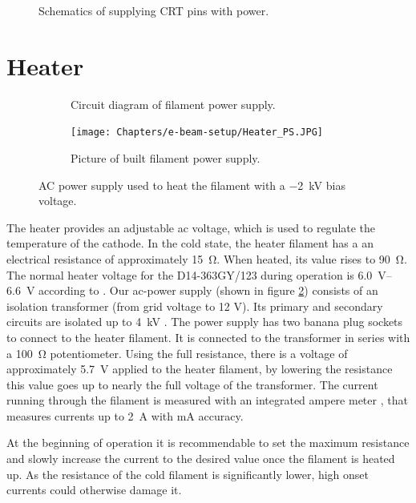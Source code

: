 \begin{figure}[H]
	\centering
	
	\begin{circuitikz}[european]
		
	\end{circuitikz}

	\caption{Schematics of supplying CRT pins with power.}
	\label{fig:schematics of wiring}
\end{figure}


\section{Heater}
\label{sec:Heater}

\begin{figure}[ht]
	\centering
	
	\begin{subfigure}[b]{0.9\textwidth}
		\begin{circuitikz}%
			
		\end{circuitikz}
		\caption{Circuit diagram of filament power supply.}
	\end{subfigure}
	
	\vspace{1cm}

	\begin{subfigure}[b]{0.9\textwidth}
		\texttt{[image: Chapters/e-beam-setup/Heater\_PS.JPG]}
		\caption{Picture of built filament power supply.}
	\end{subfigure}
	
	\caption{AC power supply used to heat the filament with a \SI{-2}{\kilo\volt} bias voltage.}
	\label{fig:heater_circuit}
\end{figure}

The heater provides an adjustable ac voltage, which is used to regulate the temperature of the cathode. In the cold state, the heater filament has a an electrical resistance of approximately \SI{15}{\ohm}. When heated, its value rises to \SI{90}{\ohm}. The normal heater voltage for the D14-363GY/123 during  operation is \SIrange{6.0}{6.6}{\volt} according to \cite{D14363GY123-manual}. 
Our ac-power supply (shown in figure \ref{fig:heater_circuit}) consists of an isolation transformer (from grid voltage to 12 V). Its primary  and secondary circuits are isolated up to \SI{4}{\kilo\volt} \cite{DS44231-DataSheet}. The power supply has two  banana plug sockets to connect to the heater filament. 
It is connected to the transformer in series with a \SI{100}{\ohm} potentiometer. Using the full resistance, there is a voltage of approximately \SI{5.7}{\volt} applied to the heater filament, by lowering the resistance this value goes up to nearly the full voltage of the transformer. 
The current running through the filament is measured with an integrated ampere meter \cite{ACA-20PC-manual}, that measures currents up to  \SI{2}{\ampere} with \si{\milli\ampere} accuracy.

At the beginning of operation it is recommendable to set the maximum resistance and slowly increase the current to the desired value once the filament is heated up. As the resistance of the cold filament is significantly lower, high onset currents could otherwise damage it.  